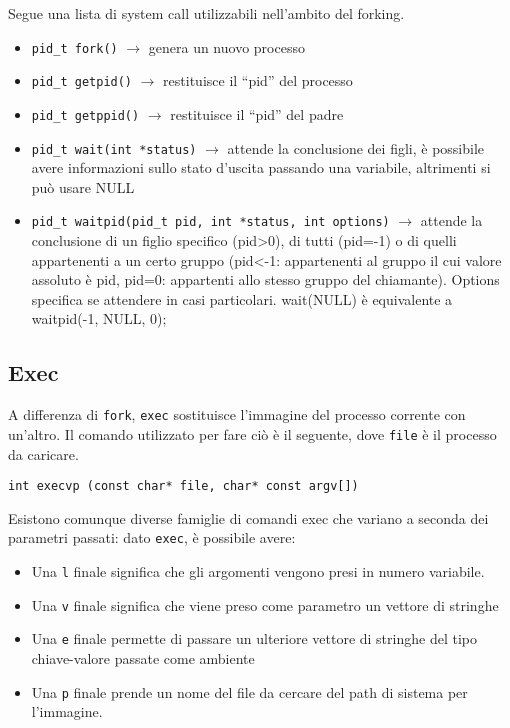 \documentclass[11pt]{article}
\begin{document}
Segue una lista di system call utilizzabili nell'ambito del forking.
\begin{itemize}
\item \verb|pid_t fork()| $\rightarrow$ genera un nuovo processo
\item \verb|pid_t getpid()| $\rightarrow$ restituisce il “pid” del processo
\item \verb|pid_t getppid()| $\rightarrow$ restituisce il “pid” del padre
\item \verb|pid_t wait(int *status)| $\rightarrow$ attende la conclusione dei figli, è possibile avere informazioni sullo stato d’uscita passando una variabile, altrimenti si può usare NULL
\item \verb|pid_t waitpid(pid_t pid, int *status, int options)| $\rightarrow$ attende la conclusione di un figlio specifico (pid>0), di tutti (pid=-1) o di quelli appartenenti a un certo gruppo (pid<-1: appartenenti al gruppo il cui valore assoluto è pid, pid=0: appartenti allo stesso gruppo del chiamante). Options specifica se attendere in casi particolari. wait(NULL) è equivalente a waitpid(-1, NULL, 0);
\end{itemize}

\subsection{Exec}

A differenza di \verb|fork|, \verb|exec| sostituisce l'immagine del processo corrente con un'altro. Il comando utilizzato per fare ciò è il seguente, dove \verb|file| è il processo da caricare.

\verb|int execvp (const char* file, char* const argv[])|

Esistono comunque diverse famiglie di comandi exec che variano a seconda dei parametri passati: dato \verb|exec|, è possibile avere:

\begin{itemize}
\item Una \verb|l| finale significa che gli argomenti vengono presi in numero variabile. 
\item Una \verb|v| finale significa che viene preso come parametro un vettore di stringhe
\item Una \verb|e| finale permette di passare un ulteriore vettore di stringhe del tipo chiave-valore passate come ambiente
\item Una \verb|p| finale prende un nome del file da cercare del path di sistema per l'immagine.
\end{itemize}
\end{document}
